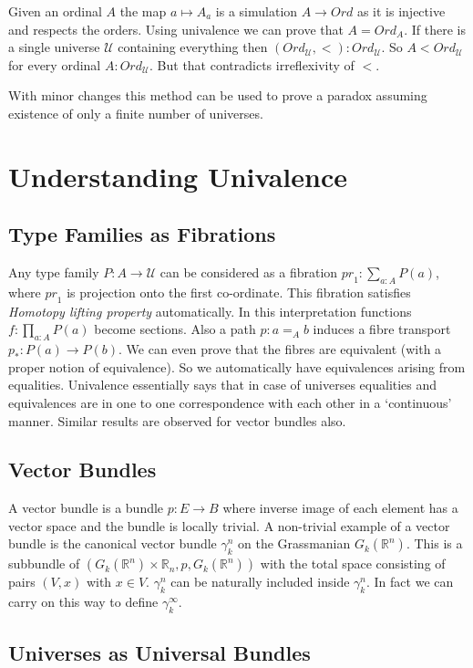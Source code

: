 \documentclass[10pt]{article}
\theoremstyle{definition}
\theoremstyle{plain}
\theoremstyle{remark}
\newcommand{\U}{\mathscr{U}}
\begin{document}
Given an ordinal $A$ the map $a \mapsto A_a$ is a simulation $A \to {Ord}$ as it is 
injective and respects the orders. Using univalence we can prove that $A = {Ord}_A$. 
If there is a single universe $\U$ containing everything then 
$({Ord}_{\U},<) : {Ord}_{\U}$. So $A < {Ord}_{\U}$ for every ordinal 
$A : {Ord}_{\U}$. But that contradicts irreflexivity of $<$.\smallskip

With minor changes this method can be used to prove a paradox assuming existence of only a
finite number of universes. 

\section{Understanding Univalence}\label{S:UU}

\subsection{Type Families as Fibrations}
Any type family $P : A \to \U$ can be considered as a fibration 
${ {pr}_1 : \sum_{a : A} P(a) }$, where ${pr}_1$ is projection onto the first
co-ordinate. This fibration satisfies \emph{Homotopy lifting property} automatically. 
In this interpretation functions $f : \prod_{a : A} P(a)$ become sections. Also a path 
$p : a =_A b$ induces a fibre transport $p_* : P(a) \to P(b)$. We can even prove that the 
fibres are equivalent (with a proper notion of equivalence). So we automatically have 
equivalences arising from equalities. Univalence essentially says that in case of universes
equalities and equivalences are in one to one correspondence with each other in a `continuous'
manner. Similar results are observed for vector bundles also.

\subsection{Vector Bundles}
A vector bundle is a bundle $p : E \to B$ where inverse image of each element has a 
vector space and the bundle is locally trivial. A non-trivial example of a vector bundle is 
the canonical vector bundle $\gamma^n_k$ on the Grassmanian $G_k(\mathbb{R}^n)$. This is a 
subbundle of $(G_k(\mathbb{R}^n) \times \mathbb{R}_n,p,G_k(\mathbb{R}^n))$ with the total
space consisting of pairs $(V,x)$ with $x\in V$. $\gamma^n_k$ can be naturally included 
inside $\gamma^n_k$. In fact we can carry on this way to define $\gamma^{\infty}_k$. 

\subsection{Universes as Universal Bundles}
\end{document}
